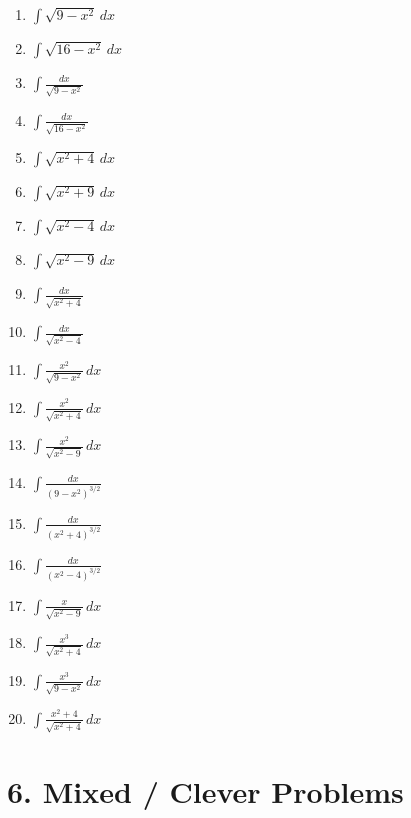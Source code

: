 \documentclass[11pt]{article}
\begin{document}
\begin{enumerate}
\item $\displaystyle \int \sqrt{9-x^2}\,dx$
\item $\displaystyle \int \sqrt{16-x^2}\,dx$
\item $\displaystyle \int \frac{dx}{\sqrt{9-x^2}}$
\item $\displaystyle \int \frac{dx}{\sqrt{16-x^2}}$
\item $\displaystyle \int \sqrt{x^2+4}\,dx$
\item $\displaystyle \int \sqrt{x^2+9}\,dx$
\item $\displaystyle \int \sqrt{x^2-4}\,dx$
\item $\displaystyle \int \sqrt{x^2-9}\,dx$
\item $\displaystyle \int \frac{dx}{\sqrt{x^2+4}}$
\item $\displaystyle \int \frac{dx}{\sqrt{x^2-4}}$
\item $\displaystyle \int \frac{x^2}{\sqrt{9-x^2}}\,dx$
\item $\displaystyle \int \frac{x^2}{\sqrt{x^2+4}}\,dx$
\item $\displaystyle \int \frac{x^2}{\sqrt{x^2-9}}\,dx$
\item $\displaystyle \int \frac{dx}{(9-x^2)^{3/2}}$
\item $\displaystyle \int \frac{dx}{(x^2+4)^{3/2}}$
\item $\displaystyle \int \frac{dx}{(x^2-4)^{3/2}}$
\item $\displaystyle \int \frac{x}{\sqrt{x^2-9}}\,dx$
\item $\displaystyle \int \frac{x^3}{\sqrt{x^2+4}}\,dx$
\item $\displaystyle \int \frac{x^3}{\sqrt{9-x^2}}\,dx$
\item $\displaystyle \int \frac{x^2+4}{\sqrt{x^2+4}}\,dx$
\end{enumerate}

\section*{6. Mixed / Clever Problems}
\end{document}
